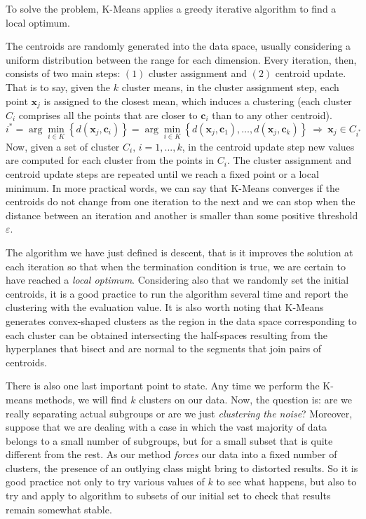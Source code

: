 \documentclass[a4paper]{article}
\begin{document}
	To solve the problem, K-Means applies a greedy iterative algorithm to find a local optimum.

	The centroids are randomly generated into the data space, usually considering a uniform distribution between the range for each dimension. Every iteration, then, consists of two main steps: $(1)$ cluster assignment and $(2)$ centroid update. That is to say, given the $k$ cluster means, in the cluster assignment step, each point $\boldsymbol{x}_{j}$ is assigned to the closest mean, which induces a clustering (each cluster $C_{i}$ comprises all the points that are closer to $\boldsymbol{c}_{i}$ than to any other centroid).
	\begin{equation*}
	i^{*}=\arg\underset{i\in K}{ \min}\left\{ d(\boldsymbol{x}_{j},\boldsymbol{c}_{i})\right\} =\arg\min_{i \in K}\left\{ d(\boldsymbol{x}_{j},\boldsymbol{c}_{1}),\ldots,d(\boldsymbol{x}_{j},\boldsymbol{c}_{k})\right\} \:\Longrightarrow\:\boldsymbol{x}_{j}\in C_{i^{*}}
	\end{equation*}
	Now, given a set of cluster $C_{i},\, i=1,...,k$, in the centroid update step new values are computed for each cluster from the points in $C_{i}$. The cluster assignment and centroid update steps are repeated until we reach a fixed point or a local minimum. In more practical words, we can say that K-Means converges if the centroids do not change from one iteration to the next and we can stop when the distance between an iteration and another is smaller than some positive threshold $\varepsilon$.

	The algorithm we have just defined is descent, that is it improves
	the solution at each iteration so that when the termination condition
	is true, we are certain to have reached a \textsl{local optimum}.
	Considering also that we randomly set the initial centroids, it is a good practice to run the algorithm several time and report the clustering with the evaluation value. It is also worth noting that K-Means generates convex-shaped clusters as the region in the data space corresponding to each cluster can be obtained intersecting the half-spaces resulting from the hyperplanes that bisect and are normal to the segments that join pairs of centroids.

	There is also one last important point to state. Any time we perform
	the K-means methods, we will find $k$ clusters on our data. Now,
	the question is: are we really separating actual subgroups or are
	we just \textsl{clustering the noise}? Moreover, suppose that we are
	dealing with a case in which the vast majority of data belongs to
	a small number of subgroups, but for a small subset that is quite
	different from the rest. As our method \textsl{forces} our data into
	a fixed number of clusters, the presence of an outlying class might
	bring to distorted results. So it is good practice not only to try
	various values of $k$ to see what happens, but also to try and apply
	to algorithm to subsets of our initial set to check that results remain
	somewhat stable.
\end{document}
